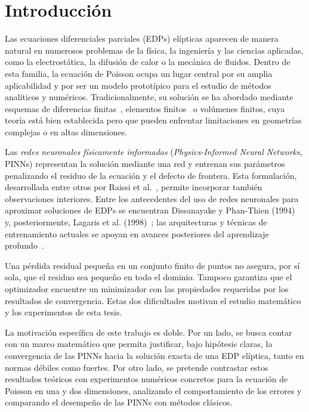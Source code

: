 \chapter*{Introducción}

Las ecuaciones diferenciales parciales (EDPs) elípticas aparecen de manera natural en numerosos problemas de la física, la ingeniería y las ciencias aplicadas, como la electrostática, la difusión de calor o la mecánica de fluidos. Dentro de esta familia, la ecuación de Poisson ocupa un lugar central por su amplia aplicabilidad y por ser un modelo prototípico para el estudio de métodos analíticos y numéricos. Tradicionalmente, su solución se ha abordado mediante esquemas de diferencias finitas~\cite{leveque2007}, elementos finitos~\cite{strang1973, babuska1994} o volúmenes finitos, cuya teoría está bien establecida pero que pueden enfrentar limitaciones en geometrías complejas o en altas dimensiones.

Las \emph{redes neuronales físicamente informadas} (\emph{Physics-Informed Neural Networks}, PINNs) representan la solución mediante una red y entrenan sus parámetros penalizando el residuo de la ecuación y el defecto de frontera. Esta formulación, desarrollada entre otros por Raissi et al.~\cite{raissi2017physics, raissi2019}, permite incorporar también observaciones interiores. Entre los antecedentes del uso de redes neuronales para aproximar soluciones de EDPs se encuentran Dissanayake y Phan-Thien (1994)~\cite{dissanayake1994neural} y, posteriormente, Lagaris et al. (1998)~\cite{lagaris1998artificial}; las arquitecturas y técnicas de entrenamiento actuales se apoyan en avances posteriores del aprendizaje profundo~\cite{goodfellow2016deep, lecun2015deep}.

Una pérdida residual pequeña en un conjunto finito de puntos no asegura, por sí sola, que el residuo sea pequeño en todo el dominio. Tampoco garantiza que el optimizador encuentre un minimizador con las propiedades requeridas por los resultados de convergencia. Estas dos dificultades motivan el estudio matemático y los experimentos de esta tesis.

La motivación específica de este trabajo es doble. Por un lado, se busca contar con un marco matemático que permita justificar, bajo hipótesis claras, la convergencia de las PINNs hacia la solución exacta de una EDP elíptica, tanto en normas débiles como fuertes. Por otro lado, se pretende contrastar estos resultados teóricos con experimentos numéricos concretos para la ecuación de Poisson en una y dos dimensiones, analizando el comportamiento de los errores y comparando el desempeño de las PINNs con métodos clásicos.

